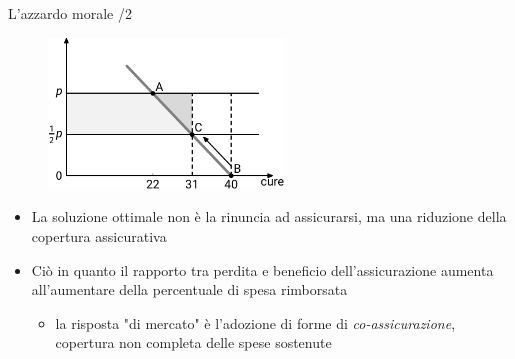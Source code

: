 \documentclass[aspectratio=149,11pt]{beamer}
\begin{document}
\begin{frame}{L'azzardo morale /2}
\begin{figure}[htbp]
\centering
\includegraphics[height=4cm]{./figure/moral-hazard-3.pdf}
\end{figure}

\begin{itemize}
\item La soluzione ottimale non è la rinuncia ad assicurarsi, ma una riduzione
della copertura assicurativa
\item Ciò in quanto il rapporto tra perdita e beneficio dell'assicurazione aumenta
all'aumentare della percentuale di spesa rimborsata
\begin{itemize}
\item la risposta "di mercato" è l'adozione di forme di \emph{co-assicurazione},
copertura non completa delle spese sostenute
\end{itemize}
\end{itemize}
\end{frame}
\end{document}
